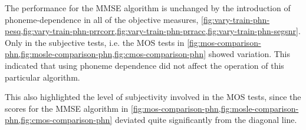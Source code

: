 The performance for the \ac{MMSE} algorithm is unchanged by the introduction
of phoneme-dependence in all of the objective measures, \cref{fig:vary-train-phn-pesq,fig:vary-train-phn-prrcorr,fig:vary-train-phn-prracc,fig:vary-train-phn-segsnr}.
Only in the subjective tests, i.e. the \ac{MOS} tests in \cref{fig:mos-comparison-phn,fig:mosle-comparison-phn,fig:cmos-comparison-phn}
showed variation. This indicated that using phoneme dependence did
not affect the operation of this particular algorithm.

This also highlighted the level of subjectivity involved in the \ac{MOS}
tests, since the scores for the \ac{MMSE} algorithm in \cref{fig:mos-comparison-phn,fig:mosle-comparison-phn,fig:cmos-comparison-phn}
deviated quite significantly from the diagonal line.
